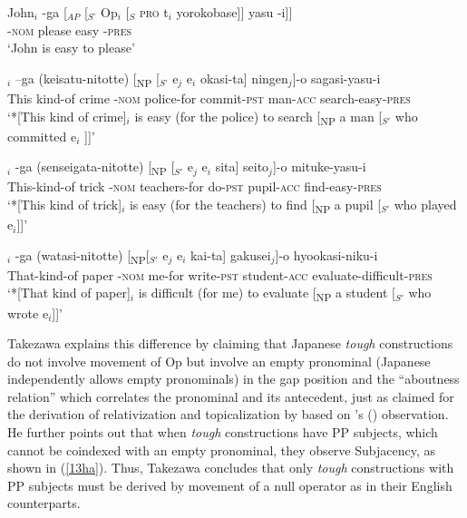 \documentclass[output=paper,colorlinks,citecolor=brown,
]{langscibook}
\begin{document}
\begin{exe}
\ex \label{11ha}
\gll John$_{i}$ -ga [$_{AP}$ [$_{S’}$ Op$_{i}$ [$_{S}$ \textsc{pro} t$_{i}$ yorokobase]] yasu -i]]\\
{} -\textsc{nom} {} {} {} {} {} {} please easy -\textsc{pres}\\
\glt ‘John is easy to please’

\ex \label{12ha}
\begin{xlist}
\ex \label{12aha}
$_{i}$ –ga (keisatu-nitotte) [\textsubscript{NP} [$_{S’}$ e$_{j}$ e$_{i}$ okasi-ta] ningen$_{j}$]-o  sagasi-yasu-i\\
This kind-of crime -\textsc{nom} police-for {} {} {} {} commit-\textsc{pst} man-\textsc{acc} search-easy-\textsc{pres}\\
\glt `*[This kind of crime]$_{i}$ is easy (for the police) to search [\textsubscript{NP} a man [$_{S'}$ who committed e$_{i}$ ]]'

\ex \label{12bha}
$_{i}$ -ga (senseigata-nitotte) [\textsubscript{NP} [$_{S'}$ e$_{j}$ e$_{i}$ sita] seito$_{j}$]-o    mituke-yasu-i\\
This-kind-of trick -\textsc{nom} teachers-for {} {} {} {} do-\textsc{pst} pupil-\textsc{acc} find-easy-\textsc{pres}\\
\glt `*[This kind of trick]$_{i}$ is easy (for the teachers) to find [\textsubscript{NP} a pupil [$_{S'}$ who played e$_{i}$]]'



\ex \label{12cha}
$_{i}$ -ga (watasi-nitotte) [\textsubscript{NP}[$_{S'}$ e$_{j}$ e$_{i}$ kai-ta] gakusei$_{j}$]-o  hyookasi-niku-i\\
That-kind-of paper  -\textsc{nom}  me-for  {} {} {}   write-\textsc{pst} student-\textsc{acc} evaluate-difficult-\textsc{pres}\\
\glt `*[That kind of paper]$_{i}$ is difficult (for me) to evaluate [\textsubscript{NP} a student [$_{S'}$ who wrote e$_{i}$]]’ \hspace{30mm} \citep[203]{takezawa1987}                   
\end{xlist}
\end{exe}

Takezawa explains this difference by claiming that Japanese \textit{tough} constructions do not involve movement of Op but involve an empty pronominal (Japanese independently allows empty pronominals) in the gap position and the “aboutness relation” which correlates the pronominal and its antecedent, just as claimed for the derivation of relativization and topicalization by \citet{Saito1985} based on \citeauthor{kuno1973}’s (\citeyear{kuno1973}) observation. He further points out that when \textit{tough} constructions have PP subjects, which cannot be coindexed with an empty pronominal, they observe Subjacency, as shown in (\ref{13ha}). Thus, Takezawa concludes that only \textit{tough} constructions with PP subjects must be derived by movement of a null operator as in their English counterparts.
\end{document}
